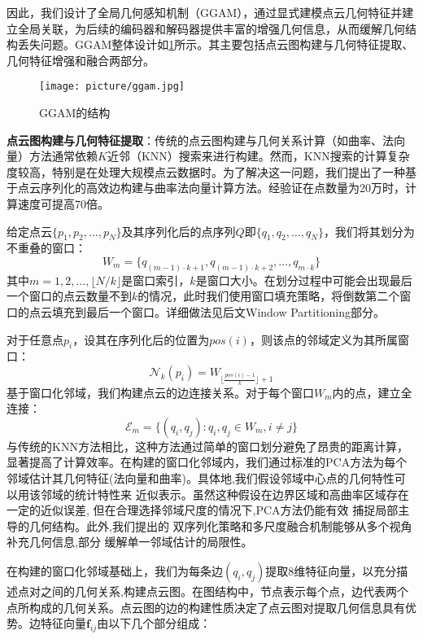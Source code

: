 \documentclass[preprint,12pt]{elsarticle}
\begin{document}
因此，我们设计了全局几何感知机制（GGAM），通过显式建模点云几何特征并建立全局关联，为后续的编码器和解码器提供丰富的增强几何信息，从而缓解几何结构丢失问题。GGAM整体设计如\cref{fig:ggam}所示。其主要包括点云图构建与几何特征提取、几何特征增强和融合两部分。
\begin{figure}[htbp]
	\centering
	\texttt{[image: picture/ggam.jpg]}
	\caption{GGAM的结构}
	\label{fig:ggam}
\end{figure}

\textbf{点云图构建与几何特征提取}：传统的点云图构建与几何关系计算（如曲率、法向量）方法通常依赖$K$近邻（KNN）搜索来进行构建。然而，KNN搜索的计算复杂度较高，特别是在处理大规模点云数据时。为了解决这一问题，我们提出了一种基于点云序列化的高效边构建与曲率法向量计算方法。经验证在点数量为20万时，计算速度可提高70倍。


给定点云$\{p_1, p_2, \ldots, p_N\}$及其序列化后的点序列$Q$即$\{q_1, q_2, \ldots, q_N\}$，我们将其划分为不重叠的窗口：
\begin{equation}
	W_m = \{q_{(m-1) \cdot k + 1}, q_{(m-1) \cdot k + 2}, \ldots, q_{m \cdot k}\}
\end{equation}
其中$m = 1, 2, \ldots, \lfloor N/k \rfloor$是窗口索引，$k$是窗口大小。在划分过程中可能会出现最后一个窗口的点云数量不到$k$的情况，此时我们使用窗口填充策略，将倒数第二个窗口的点云填充到最后一个窗口。详细做法见后文Window Partitioning部分。

对于任意点$p_i$，设其在序列化后的位置为$pos(i)$，则该点的邻域定义为其所属窗口：
\begin{equation}
	\mathcal{N}_k(p_i) = W_{\lfloor \frac{pos(i)-1}{k} \rfloor + 1}
\end{equation}
基于窗口化邻域，我们构建点云的边连接关系。对于每个窗口$W_m$内的点，建立全连接：
\begin{equation}
	\mathcal{E}_m = \{(q_i, q_j) : q_i, q_j \in W_m, i \neq j\}
\end{equation}
与传统的KNN方法相比，这种方法通过简单的窗口划分避免了昂贵的距离计算，显著提高了计算效率。在构建的窗口化邻域内，我们通过标准的PCA方法为每个邻域估计其几何特征(法向量和曲率)。具体地,我们假设邻域中心点的几何特性可以用该邻域的统计特性来
近似表示。虽然这种假设在边界区域和高曲率区域存在一定的近似误差,
但在合理选择邻域尺度的情况下,PCA方法仍能有效
捕捉局部主导的几何结构\cite{PointNet++}。此外,我们提出的
双序列化策略和多尺度融合机制能够从多个视角补充几何信息,部分
缓解单一邻域估计的局限性。


在构建的窗口化邻域基础上，我们为每条边$(q_i, q_j)$提取8维特征向量，以充分描述点对之间的几何关系,构建点云图。在图结构中，节点表示每个点，边代表两个点所构成的几何关系。点云图的边的构建性质决定了点云图对提取几何信息具有优势。边特征向量$\mathbf{f}_{ij}$由以下几个部分组成：
 
\end{document}
